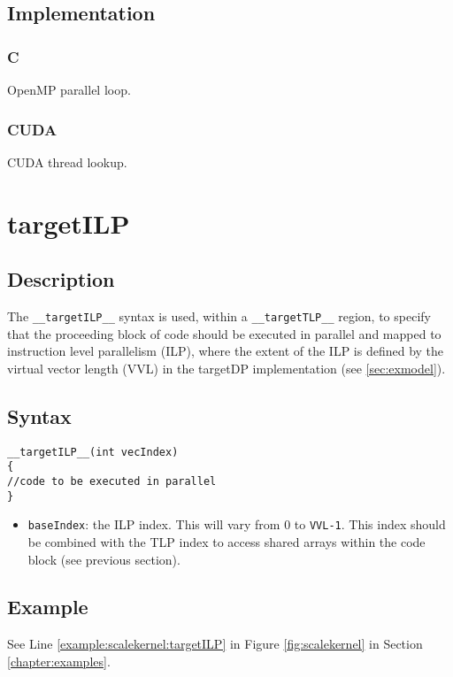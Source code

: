 \subsection{Implementation}
\subsubsection{C}
OpenMP parallel loop.
\subsubsection{CUDA}
CUDA thread lookup.

\newpage
\section{targetILP}\label{sec:ILP}

\subsection{Description}

The \verb+__targetILP__+ syntax is used, within a \verb+__targetTLP__+
region, to specify that the proceeding block of code should be
executed in parallel and mapped to instruction level parallelism
(ILP), where the extent of the ILP is defined by the virtual vector length (VVL) in the targetDP implementation (see \ref{sec:exmodel}). 

\subsection{Syntax}
\begin{verbatim}
__targetILP__(int vecIndex) 
{
//code to be executed in parallel
}
\end{verbatim}

\begin{itemize}
\item \verb+baseIndex+: the ILP index. This will vary from 0 to \verb+VVL-1+.  This index should be combined with the TLP index to access shared arrays within the code block (see previous section).
\end{itemize}


\subsection{Example}
See Line \ref{example:scalekernel:targetILP} in Figure \ref{fig:scalekernel} in Section \ref{chapter:examples}.

